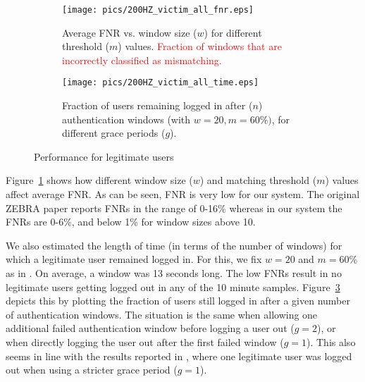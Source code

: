 \documentclass[conference]{IEEEtran}
\newcommand{\zebra}{ZEBRA\xspace}
\newif\ifllncs
\newcommand\changeMika[1]{\textcolor{red}{#1}}
\newcommand\changeMika[1]{{#1}}
\begin{document}
\ifllncs
\begin{figure}
\centering
\begin{subfigure}{.5\textwidth}
  \centering
  \texttt{[image: pics/200HZ\_victim\_all\_fnr.eps]}
\caption{}
  \label{fig:victim_fnr}
\end{subfigure}\begin{subfigure}{.5\textwidth}
  \centering
  \texttt{[image: pics/200HZ\_victim\_all\_time.eps]}
\caption{}
  \label{fig:victim_time}
\end{subfigure}
\caption{Performance for legitimate users: \textbf{(a)} Average FNR for different threshold ($m$)values. \textbf{(b)} Fraction of users remaining logged in after ($n$) authentication windows (with $w=20, m=60\%)$, for different grace periods ($g$).}
\end{figure}

\else

\begin{figure}[bh!]
	\centering
	\begin{subfigure}[b]{1\linewidth}
	\centering
		\texttt{[image: pics/200HZ\_victim\_all\_fnr.eps]}
		\caption{Average FNR vs. window size ($w$) for different threshold ($m$) values. \changeMika{Fraction of windows that are incorrectly classified as mismatching.}}
		\label{fig:victim_fnr}
	\end{subfigure}

	\begin{subfigure}[b]{1\linewidth}
	\centering
		\texttt{[image: pics/200HZ\_victim\_all\_time.eps]}
		\caption{Fraction of users remaining logged in after ($n$) authentication windows (with $w=20, m=60\%)$, for different grace periods ($g$).}
		\label{fig:victim_time}
	\end{subfigure}
	\caption{Performance for legitimate users}
\end{figure}

\fi



Figure~\ref{fig:victim_fnr} shows how different window size ($w$) and matching threshold ($m$) values affect average FNR. 
As can be seen, FNR is very low for our system. The original \zebra paper \cite{mare2014zebra} reports FNRs in the range of 0-16\% whereas in our system the FNRs are 0-6\%, and below 1\% for window sizes above 10. 

We also estimated the length of time (in terms of the number of windows) for which a legitimate user remained logged in. For this, we fix $w=20$ and $m=60\%$ as in \cite{mare2014zebra}. On average, a window was 13 seconds long. The low FNRs result in no legitimate users getting logged out in any of the 10 minute samples. Figure~\ref{fig:victim_time} depicts this by plotting the fraction of users still logged in after a given number of authentication windows. The situation is the same when allowing one additional failed authentication window before logging a user out ($g=2$), or when directly logging the user out after the first failed window ($g=1$). This also seems in line with the results reported in \cite{mare2014zebra}, where one legitimate user was logged out when using a stricter grace period ($g=1$). 
\end{document}
